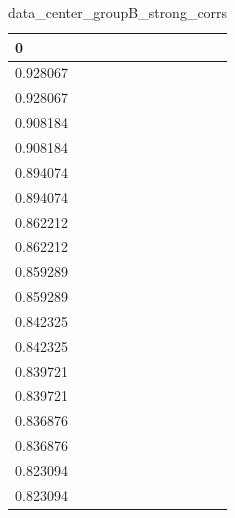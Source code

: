 \begin{table}
\caption{data_center_groupB_strong_corrs}
\label{tab:data_summary}
\begin{tabular}{lcr}
\toprule
0 \\
\midrule
0.928067 \\
0.928067 \\
0.908184 \\
0.908184 \\
0.894074 \\
0.894074 \\
0.862212 \\
0.862212 \\
0.859289 \\
0.859289 \\
0.842325 \\
0.842325 \\
0.839721 \\
0.839721 \\
0.836876 \\
0.836876 \\
0.823094 \\
0.823094 \\
\bottomrule
\end{tabular}
\end{table}
